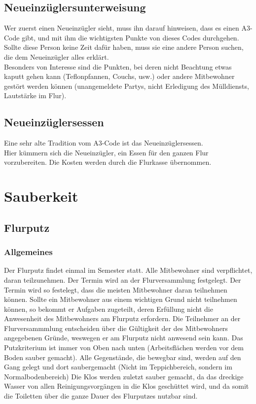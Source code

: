 \documentclass[10pt,a4paper,final]{article}
\begin{document}
\subsection{Neueinzüglersunterweisung}
Wer zuerst einen Neueinzügler sieht, muss ihn darauf hinweisen, dass es einen A3-Code gibt, und mit ihm die wichtigsten Punkte von dieses Codes durchgehen. Sollte diese Person keine Zeit dafür haben, muss sie eine andere Person suchen, die dem Neueinzügler alles erklärt.\\
Besonders von Interesse sind die Punkten, bei deren nicht Beachtung etwas kaputt gehen kann (Teflonpfannen, Couchs, usw.) oder andere Mitbewohner gestört werden können (unangemeldete Partys, nicht Erledigung des Mülldiensts, Lautstärke im Flur).
\subsection{Neueinzüglersessen}
Eine sehr alte Tradition vom A3-Code ist das Neueinzüglersessen.\\
Hier kümmern sich die Neueinzügler, ein Essen für den ganzen Flur vorzubereiten. Die Kosten werden durch die Flurkasse übernommen.
\section{Sauberkeit}
\subsection{Flurputz}
\subsubsection{Allgemeines}
Der Flurputz findet einmal im Semester statt. Alle Mitbewohner sind verpflichtet, daran teilzunehmen. Der Termin wird an der Flurversammlung festgelegt. Der Termin wird so festelegt, dass die meisten Mitbewohner daran teilnehmen können. Sollte ein Mitbewohner aus einem wichtigen Grund nicht teilnehmen können, so bekommt er Aufgaben zugeteilt, deren Erfüllung nicht die Anwesenheit des Mitbewohners am Flurputz erfordern. Die Teilnehmer an der Flurversammmlung entscheiden über die Gültigkeit der des Mitbewohners angegebenen Gründe, weswegen er am Flurputz nicht anwesend sein kann. 
Das Putzkriterium ist immer von Oben nach unten (Arbeitsflächen werden vor dem Boden sauber gemacht).
Alle Gegenstände, die bewegbar sind, werden auf den Gang gelegt und dort saubergemacht (Nicht im Teppichbereich, sondern im Normalbodenbereich)
Die Klos werden zuletzt sauber gemacht, da das dreckige Wasser von allen Reinigungsvorgängen in die Klos geschüttet wird, und da somit die Toiletten über die ganze Dauer des Flurputzes nutzbar sind.
\end{document}
